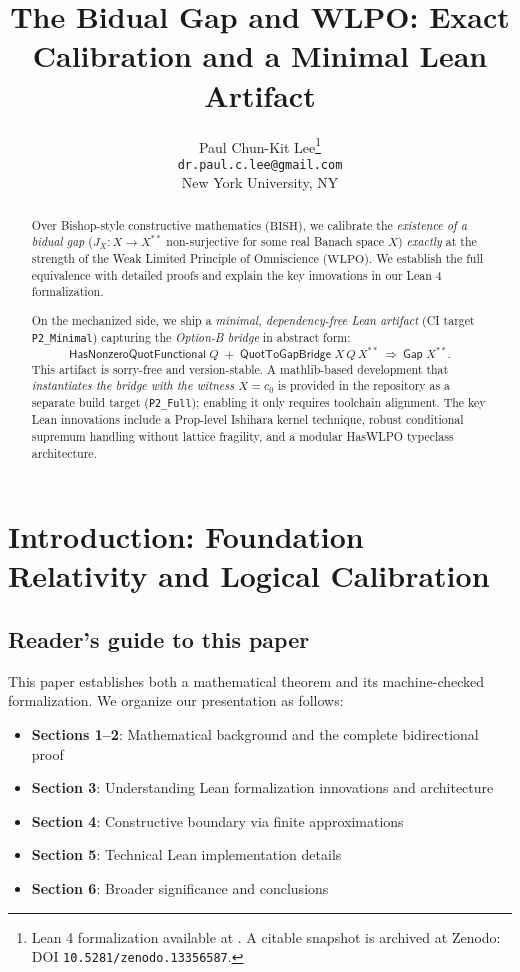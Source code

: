 \documentclass[11pt]{article}  %
\title{The Bidual Gap and WLPO: Exact Calibration and a Minimal Lean Artifact}
\author{Paul Chun-Kit Lee\thanks{Lean 4 formalization available at \leanRepo. A citable snapshot is archived at Zenodo: DOI \texttt{10.5281/zenodo.13356587}.} \\ 
\texttt{dr.paul.c.lee@gmail.com} \\
New York University, NY}
\date{}
\newcommand{\WLPO}{\mathrm{WLPO}}
\newcommand{\BISH}{\mathrm{BISH}}
\begin{document}
\begin{abstract}
Over Bishop-style constructive mathematics ($\BISH$), we calibrate the \emph{existence of a bidual gap}
($J_X:X\to X^{**}$ non-surjective for some real Banach space $X$) \emph{exactly} at the strength of
the Weak Limited Principle of Omniscience ($\WLPO$). We establish the full equivalence with detailed proofs
and explain the key innovations in our Lean 4 formalization.

On the mechanized side, we ship a \emph{minimal, dependency-free Lean artifact} (CI target \texttt{P2\_Minimal})
capturing the \emph{Option-B bridge} in abstract form:
\[
\textsf{HasNonzeroQuotFunctional}\;Q \;+\; \textsf{QuotToGapBridge}\;X\,Q\,X^{**}\ \Longrightarrow\ \textsf{Gap}\;X^{**}.
\]
This artifact is sorry-free and version-stable. A mathlib-based development that \emph{instantiates the bridge with the witness $X=c_0$} is provided in the repository as a separate build target (\texttt{P2\_Full}); enabling it only requires toolchain alignment. The key Lean innovations include a Prop-level Ishihara kernel technique, robust conditional supremum handling without lattice fragility, and a modular HasWLPO typeclass architecture.
\end{abstract}

\maketitle

\tableofcontents

\section{Introduction: Foundation Relativity and Logical Calibration}

\subsection{Reader's guide to this paper}

This paper establishes both a mathematical theorem and its machine-checked formalization. We organize our presentation as follows:

\begin{itemize}
\item \textbf{Sections 1--2}: Mathematical background and the complete bidirectional proof
\item \textbf{Section 3}: Understanding Lean formalization innovations and architecture  
\item \textbf{Section 4}: Constructive boundary via finite approximations
\item \textbf{Section 5}: Technical Lean implementation details
\item \textbf{Section 6}: Broader significance and conclusions
\end{itemize}
\end{document}
